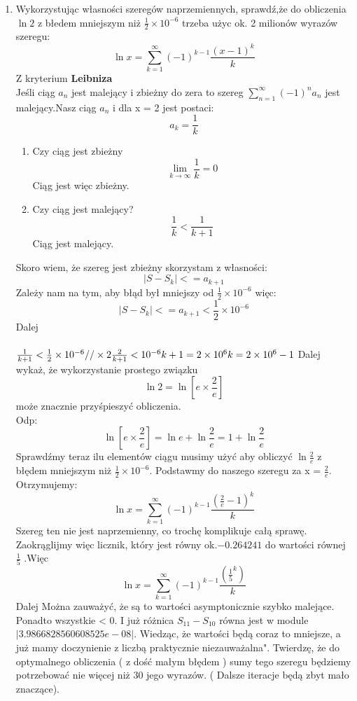 \documentclass[fleqn]{article}
\begin{document}
\begin{enumerate}
  \item Wykorzystując własności szeregów naprzemiennych, sprawdź,że do obliczenia $ \ln2 $ z błedem mniejszym niż
  $\frac{1}{2}\times 10^{-6} $ trzeba użyc ok. 2 milionów wyrazów szeregu:\\
  \[\ln x = \sum_{k=1}^\infty(-1)^{k-1}\frac{(x-1)^k}{k}\]
   Z kryterium \textbf{Leibniza}\\
   Jeśli ciąg $a_{n}$ jest malejący i zbieżny do zera to szereg $\sum_{n=1}^\infty(-1)^{n}a_{n}$ jest malejący.Nasz ciąg $a_{n}$ i dla x = 2 jest postaci:
   \[a_{k} = \frac{1}{k}\]
    \begin{enumerate}
   \item Czy ciąg jest zbieżny
   \[\lim_{k \rightarrow \infty}\frac{1}{k} = 0\]
   Ciąg jest więc zbieżny.
   \item Czy ciąg jest malejący?
   \[\frac{1}{k} < \frac{1}{k+1}\]
   Ciąg jest malejący.
   \end{enumerate}
     Skoro wiem, że szereg jest zbieżny skorzystam z własności:
   \[|S - S_{k}| <= a_{k+1}\]
    Zależy nam na tym, aby błąd był mniejszy od $\frac{1}{2}\times 10^{-6}$ więc:
   \[|S - S_{k}| <= a_{k+1} < \frac{1}{2}\times 10^{-6}\]
   Dalej \\ \\ 
   $
   \frac{1}{k+1} <  \frac{1}{2}\times 10^{-6} // \times 2 \newline \newline
   \frac{2}{k+1} <  10^{-6} \\ \\
   k + 1= 2 \times 10^{6} \\ \\
   k = 2 \times 10^{6} - 1 \\ \\
   $
   Dalej wykaż, że wykorzystanie prostego związku \[\ln 2 = \ln[e\times\frac{2}{e}]\] może znacznie przyśpieszyć obliczenia.
   \\Odp:
   \\
   \[\ln[e\times\frac{2}{e}] = \ln e + \ln \frac{2}{e} = 1 + \ln \frac{2}{e}\]
   Sprawdźmy teraz ilu elementów ciągu musimy użyć aby obliczyć $ \ln \frac{2}{e} $ z błędem mniejszym niż $\frac{1}{2}\times 10^{-6} $.
   Podstawmy do naszego szeregu za x = $ \frac{2}{e}  $. Otrzymujemy:\\
   \[\ln x = \sum_{k=1}^\infty(-1)^{k-1}\frac{(\frac{2}{e}-1)^k}{k}\]
   Szereg ten nie jest naprzemienny, co trochę komplikuje całą sprawę.\\ Zaokrąglijmy więc licznik, który jest równy ok.$ -0.264241 $ do wartości równej $ \frac{1}{5} $ .Więc\\
  \[\ln x = \sum_{k=1}^\infty(-1)^{k-1}\frac{(\frac{1}{5}^{k})}{k}\]
  Dalej
  Można zauważyć, że są to wartości asymptonicznie szybko malejące. Ponadto wszystkie < 0. I już różnica $ S_{11} - S_{10} $ równa jest w module $ |3.9866828560608525e-08 |$. Wiedząc, że wartości będą coraz to mniejsze, a już mamy doczynienie z liczbą praktycznie niezauważalna". Twierdzę, że do  optymalnego obliczenia ( z dość małym błędem ) sumy tego szeregu będziemy potrzebować nie więcej niż 30 jego wyrazów. ( Dalsze iteracje będą zbyt mało znaczące).
  

\end{enumerate}
\end{document}
